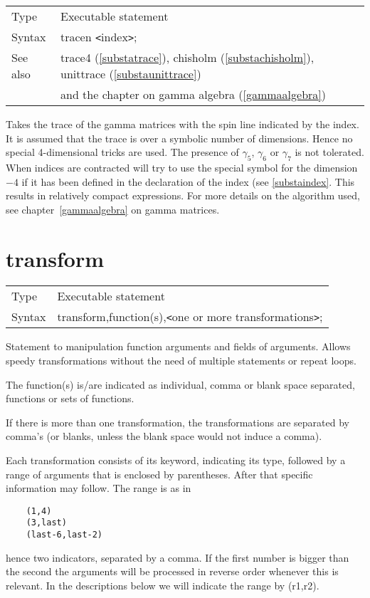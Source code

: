 \noindent \begin{tabular}{ll}
Type & Executable statement\\
Syntax & tracen {\tt<}index{\tt>}; \\
See also & trace4 (\ref{substatrace}), chisholm (\ref{substachisholm}),
    unittrace (\ref{substaunittrace}) \\ &
    and the chapter on gamma algebra (\ref{gammaalgebra})
\end{tabular} \vspace{4mm}

\noindent Takes the trace of the gamma 
matrices with the spin line indicated by the index. It is 
assumed that the trace is over a symbolic number of dimensions. Hence no 
special 4-dimensional tricks are used. The presence of $\gamma_5$, 
$\gamma_6$ or $\gamma_7$ is not tolerated. When indices are contracted 
{\FORM} will try to use the special symbol for the dimension$-4$ if it has 
been defined in the declaration of the index (see \ref{substaindex}. This 
results in relatively compact expressions. For more details on the 
algorithm used, see chapter~\ref{gammaalgebra} on gamma matrices. 
\vspace{10mm}

 
\section{transform}
\label{substatransform}

\noindent \begin{tabular}{ll}
Type & Executable statement\\
Syntax & transform,function(s),{\tt<}one or more transformations{\tt>};
\end{tabular} \vspace{4mm}

\noindent Statement to manipulation function arguments and 
fields of arguments. Allows speedy transformations without the need of 
multiple statements or repeat loops.

The function(s) is/are indicated as individual, comma or blank space 
separated, functions or sets of functions.

If there is more than one transformation, the transformations are separated 
by comma's (or blanks, unless the blank space would not induce a comma).

Each transformation consists of its keyword, indicating its type, followed 
by a range of arguments that is enclosed by parentheses. After that 
specific information may follow. The range is as 
in
\begin{verbatim}
	(1,4)
	(3,last)
	(last-6,last-2)
\end{verbatim}
hence two indicators, separated by a comma. If the first number is bigger 
than the second the arguments will be processed in reverse order whenever 
this is relevant. In the descriptions below we will indicate the range by 
(r1,r2).

